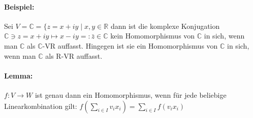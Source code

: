 \paragraph{Beispiel:}
	Sei $V = \mathbb{C} = \{z = x+iy\mid x,y\in \mathbb{R}$ dann ist die komplexe Konjugation $\mathbb{C}\ni z = x+iy \mapsto x-iy =: \bar{z} \in \mathbb{C}$ kein Homomorphismus von $\mathbb{C}$ in sich, wenn man $\mathbb{C}$ als $\mathbb{C}$-VR auffasst. Hingegen ist sie ein Homomorphismus von $\mathbb{C}$ in sich, wenn man $\mathbb{C}$ als R-VR auffasst.
\paragraph{Lemma:} $f:V\to W$ ist genau dann ein Homomorphismus, wenn für jede beliebige Linearkombination gilt: $f(\sum_{i\in I}v_ix_i) = \sum_{i\in I}f(v_ix_i)$
